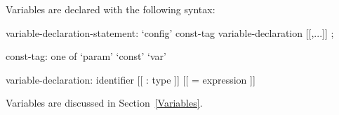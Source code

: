 Variables are declared with the following syntax:
\begin{syntax}
variable-declaration-statement:
  `config' const-tag variable-declaration [[,...]] ;

const-tag: one of
  `param' `const' `var'

variable-declaration:
  identifier [[ : type ]] [[ = expression ]]
\end{syntax}
Variables are discussed in Section~\ref{Variables}.
